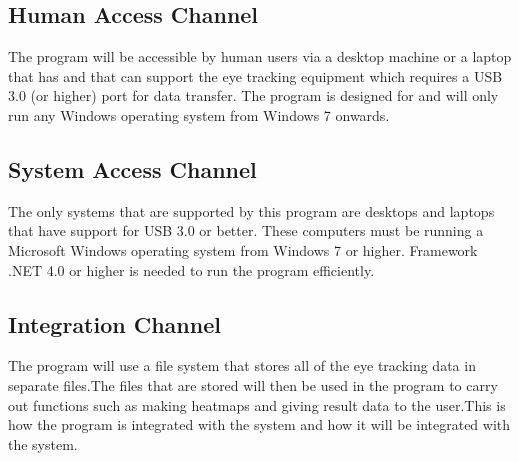 

\subsection{Human Access Channel}
    The program will be accessible by human users via a desktop machine or a laptop that has and that can support the eye tracking equipment which requires a USB 3.0 (or higher) port for data transfer. The program is designed for and will only run any Windows operating system from Windows 7 onwards.
    
\subsection{System Access Channel}
    The only systems that are supported by this program are desktops and laptops that have support for USB 3.0 or better. These computers must be running a Microsoft Windows operating system from Windows 7 or higher. Framework .NET 4.0 or higher is needed to run the program efficiently.
    
\subsection{Integration Channel}
The program will use a file system that stores all of the eye tracking data in separate files.The files that are stored will then be used in the program to carry out functions such as making heatmaps and giving result data to the user.This is how the program is integrated with the system and how it will be integrated with the system.